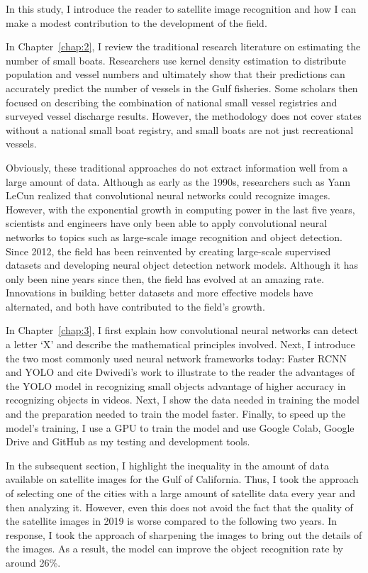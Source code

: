 
In this study, I introduce the reader to satellite image recognition and how I can make a modest contribution to the development of the field.

In Chapter~\ref{chap:2}, I review the traditional research literature on estimating the number of small boats. Researchers use kernel density estimation to distribute population and vessel numbers and ultimately show that their predictions can accurately predict the number of vessels in the Gulf fisheries. Some scholars then focused on describing the combination of national small vessel registries and surveyed vessel discharge results. However, the methodology does not cover states without a national small boat registry, and small boats are not just recreational vessels.

Obviously, these traditional approaches do not extract information well from a large amount of data. Although as early as the 1990s, researchers such as Yann LeCun realized that convolutional neural networks could recognize images. However, with the exponential growth in computing power in the last five years, scientists and engineers have only been able to apply convolutional neural networks to topics such as large-scale image recognition and object detection. Since 2012, the field has been reinvented by creating large-scale supervised datasets and developing neural object detection network models. Although it has only been nine years since then, the field has evolved at an amazing rate. Innovations in building better datasets and more effective models have alternated, and both have contributed to the field's growth.

In Chapter~\ref{chap:3}, I first explain how convolutional neural networks can detect a letter `X' and describe the mathematical principles involved. Next, I introduce the two most commonly used neural network frameworks today: Faster RCNN and YOLO and cite Dwivedi's work to illustrate to the reader the advantages of the YOLO model in recognizing small objects advantage of higher accuracy in recognizing objects in videos. Next, I show the data needed in training the model and the preparation needed to train the model faster. Finally, to speed up the model's training, I use a GPU to train the model and use Google Colab, Google Drive and GitHub as my testing and development tools.


In the subsequent section, I highlight the inequality in the amount of data available on satellite images for the Gulf of California. Thus, I took the approach of selecting one of the cities with a large amount of satellite data every year and then analyzing it. However, even this does not avoid the fact that the quality of the satellite images in 2019 is worse compared to the following two years. In response, I took the approach of sharpening the images to bring out the details of the images. As a result, the model can improve the object recognition rate by around 26\%.

